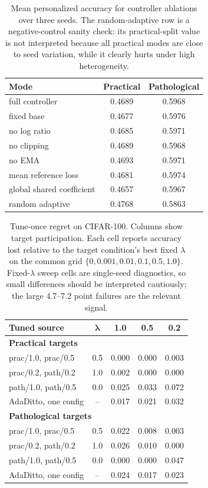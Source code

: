 \documentclass[letterpaper]{article}
\begin{document}
\begin{table}[t]
\centering
\small
\setlength{\tabcolsep}{8pt}
\renewcommand{\arraystretch}{1.08}
\begin{tabular*}{\textwidth}{@{\extracolsep{\fill}}lcc@{}}
\toprule
\textbf{Mode} & \textbf{Practical} & \textbf{Pathological} \\
\midrule
full controller & 0.4689 & 0.5968 \\
fixed base & 0.4677 & 0.5976 \\
no log ratio & 0.4685 & 0.5971 \\
no clipping & 0.4689 & 0.5968 \\
no EMA & 0.4693 & 0.5971 \\
mean reference loss & 0.4681 & 0.5974 \\
global shared coefficient & 0.4657 & 0.5967 \\
random adaptive & 0.4768 & 0.5863 \\
\bottomrule
\end{tabular*}
\caption{Mean personalized accuracy for controller ablations over three seeds. The random-adaptive row is a negative-control sanity check; its practical-split value is not interpreted because all practical modes are close to seed variation, while it clearly hurts under high heterogeneity.}
\label{tab:controller-ablations}
\end{table}

\begin{table}[t]
\centering
\small
\setlength{\tabcolsep}{8pt}
\renewcommand{\arraystretch}{1.08}
\begin{tabular*}{\textwidth}{@{\extracolsep{\fill}}lcccc@{}}
\toprule
\textbf{Tuned source} & $\boldsymbol{\lambda}$ &
\textbf{1.0} & \textbf{0.5} & \textbf{0.2} \\
\midrule
\multicolumn{5}{l}{\textbf{Practical targets}} \\
prac/1.0, prac/0.5 & 0.5 & 0.000 & 0.000 & 0.003 \\
prac/0.2, path/0.2 & 1.0 & 0.002 & 0.000 & 0.000 \\
path/1.0, path/0.5 & 0.0 & 0.025 & 0.033 & 0.072 \\
\midrule
AdaDitto, one config & -- & 0.017 & 0.021 & 0.032 \\
\midrule
\multicolumn{5}{l}{\textbf{Pathological targets}} \\
prac/1.0, prac/0.5 & 0.5 & 0.022 & 0.008 & 0.003 \\
prac/0.2, path/0.2 & 1.0 & 0.026 & 0.010 & 0.000 \\
path/1.0, path/0.5 & 0.0 & 0.000 & 0.000 & 0.047 \\
\midrule
AdaDitto, one config & -- & 0.024 & 0.017 & 0.023 \\
\bottomrule
\end{tabular*}
\caption{Tune-once regret on CIFAR-100. Columns show target participation. Each cell reports accuracy lost relative to the target condition's best fixed $\lambda$ on the common grid $\{0,0.001,0.01,0.1,0.5,1.0\}$. Fixed-$\lambda$ sweep cells are single-seed diagnostics, so small differences should be interpreted cautiously; the large 4.7--7.2 point failures are the relevant signal.}
\label{tab:tune-once-regret}
\end{table}
\end{document}
